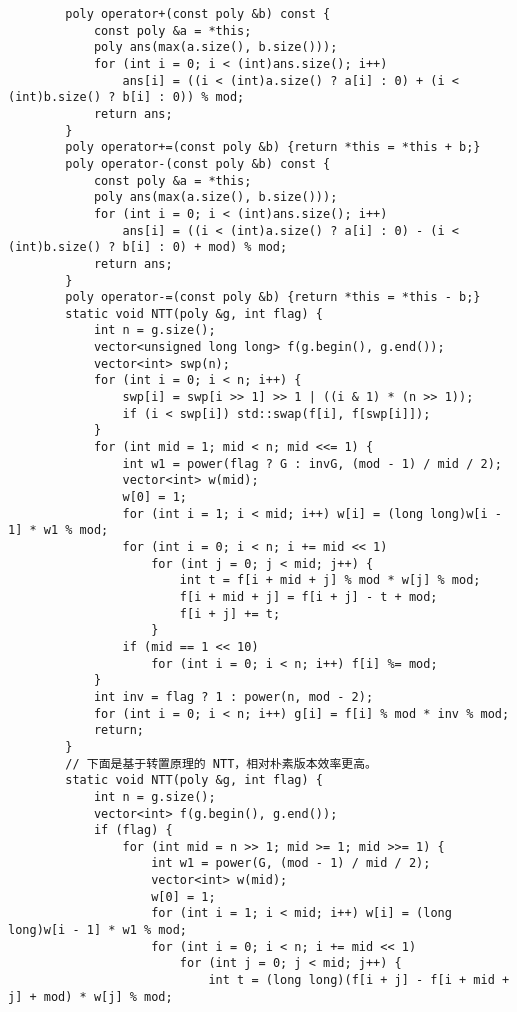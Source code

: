 \begin{verbatim}
        poly operator+(const poly &b) const {
            const poly &a = *this;
            poly ans(max(a.size(), b.size()));
            for (int i = 0; i < (int)ans.size(); i++)
                ans[i] = ((i < (int)a.size() ? a[i] : 0) + (i < (int)b.size() ? b[i] : 0)) % mod;
            return ans;
        }
        poly operator+=(const poly &b) {return *this = *this + b;}
        poly operator-(const poly &b) const {
            const poly &a = *this;
            poly ans(max(a.size(), b.size()));
            for (int i = 0; i < (int)ans.size(); i++)
                ans[i] = ((i < (int)a.size() ? a[i] : 0) - (i < (int)b.size() ? b[i] : 0) + mod) % mod;
            return ans;
        }
        poly operator-=(const poly &b) {return *this = *this - b;}
        static void NTT(poly &g, int flag) {
            int n = g.size();
            vector<unsigned long long> f(g.begin(), g.end());
            vector<int> swp(n);
            for (int i = 0; i < n; i++) {
                swp[i] = swp[i >> 1] >> 1 | ((i & 1) * (n >> 1));
                if (i < swp[i]) std::swap(f[i], f[swp[i]]);
            }
            for (int mid = 1; mid < n; mid <<= 1) {
                int w1 = power(flag ? G : invG, (mod - 1) / mid / 2);
                vector<int> w(mid);
                w[0] = 1;
                for (int i = 1; i < mid; i++) w[i] = (long long)w[i - 1] * w1 % mod;
                for (int i = 0; i < n; i += mid << 1)
                    for (int j = 0; j < mid; j++) {
                        int t = f[i + mid + j] % mod * w[j] % mod;
                        f[i + mid + j] = f[i + j] - t + mod;
                        f[i + j] += t;
                    }
                if (mid == 1 << 10)
                    for (int i = 0; i < n; i++) f[i] %= mod;
            }
            int inv = flag ? 1 : power(n, mod - 2);
            for (int i = 0; i < n; i++) g[i] = f[i] % mod * inv % mod;
            return;
        }
        // 下面是基于转置原理的 NTT，相对朴素版本效率更高。
        static void NTT(poly &g, int flag) {
            int n = g.size();
            vector<int> f(g.begin(), g.end());
            if (flag) {
                for (int mid = n >> 1; mid >= 1; mid >>= 1) {
                    int w1 = power(G, (mod - 1) / mid / 2);
                    vector<int> w(mid);
                    w[0] = 1;
                    for (int i = 1; i < mid; i++) w[i] = (long long)w[i - 1] * w1 % mod;
                    for (int i = 0; i < n; i += mid << 1)
                        for (int j = 0; j < mid; j++) {
                            int t = (long long)(f[i + j] - f[i + mid + j] + mod) * w[j] % mod;

\end{verbatim}
